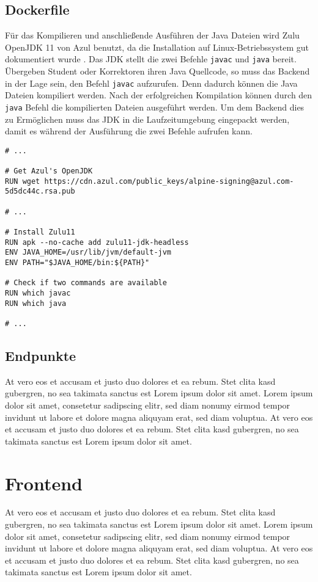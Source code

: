 \subsection{Dockerfile}
Für das Kompilieren und anschließende Ausführen der Java Dateien wird
Zulu OpenJDK 11 von Azul benutzt, da die Installation auf
Linux-Betriebssystem gut dokumentiert wurde \cite{AzulZuluJDK}.
Das JDK stellt die zwei Befehle \texttt{javac} und \texttt{java} bereit.
Übergeben Student oder Korrektoren ihren Java Quellcode, so muss das Backend in der Lage
sein, den Befehl \texttt{javac} aufzurufen. Denn dadurch können die Java Dateien kompiliert werden.
Nach der erfolgreichen Kompilation können durch den \texttt{java} Befehl die kompilierten Dateien
ausgeführt werden.
Um dem Backend dies zu Ermöglichen muss das JDK in die Laufzeitumgebung eingepackt werden,
damit es während der Ausführung die zwei Befehle aufrufen kann.\\

\begin{lstlisting}[caption={Ausschnitt aus der Dockerfile mit JDK}, label={lst:dockerfile}]
# ... 

# Get Azul's OpenJDK
RUN wget https://cdn.azul.com/public_keys/alpine-signing@azul.com-5d5dc44c.rsa.pub

# ...

# Install Zulu11
RUN apk --no-cache add zulu11-jdk-headless
ENV JAVA_HOME=/usr/lib/jvm/default-jvm
ENV PATH="$JAVA_HOME/bin:${PATH}"

# Check if two commands are available
RUN which javac
RUN which java

# ...
\end{lstlisting}

\subsection{Endpunkte}
At vero eos et accusam et justo duo dolores et ea rebum. Stet clita kasd gubergren,
no sea takimata sanctus est Lorem ipsum dolor sit amet. Lorem ipsum dolor sit amet,
consetetur sadipscing elitr, sed diam nonumy eirmod tempor invidunt ut labore et
dolore magna aliquyam erat, sed diam voluptua.
At vero eos et accusam et justo duo dolores et ea rebum.
Stet clita kasd gubergren, no sea takimata sanctus est Lorem ipsum dolor sit amet.

\section{Frontend}
At vero eos et accusam et justo duo dolores et ea rebum. Stet clita kasd gubergren,
no sea takimata sanctus est Lorem ipsum dolor sit amet. Lorem ipsum dolor sit amet,
consetetur sadipscing elitr, sed diam nonumy eirmod tempor invidunt ut labore et
dolore magna aliquyam erat, sed diam voluptua.
At vero eos et accusam et justo duo dolores et ea rebum.
Stet clita kasd gubergren, no sea takimata sanctus est Lorem ipsum dolor sit amet.
